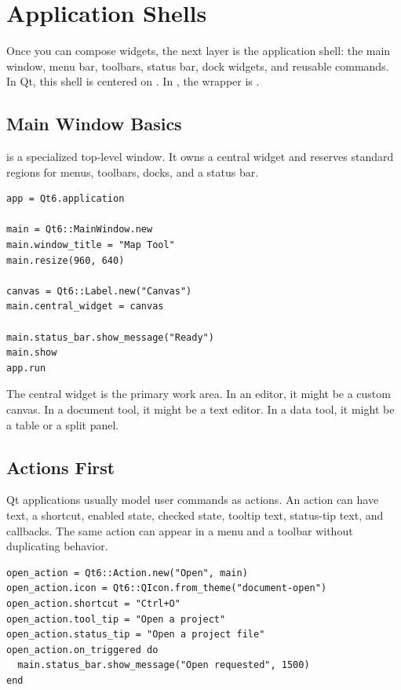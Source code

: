 \chapter{Application Shells}

Once you can compose widgets, the next layer is the application shell: the main window, menu bar, toolbars, status bar, dock widgets, and reusable commands. In Qt, this shell is centered on . In , the wrapper is .

\section{Main Window Basics}

 is a specialized top-level window. It owns a central widget and reserves standard regions for menus, toolbars, docks, and a status bar.

\begin{lstlisting}[style=crystal]
app = Qt6.application

main = Qt6::MainWindow.new
main.window_title = "Map Tool"
main.resize(960, 640)

canvas = Qt6::Label.new("Canvas")
main.central_widget = canvas

main.status_bar.show_message("Ready")
main.show
app.run
\end{lstlisting}

The central widget is the primary work area. In an editor, it might be a custom canvas. In a document tool, it might be a text editor. In a data tool, it might be a table or a split panel.

\section{Actions First}

Qt applications usually model user commands as actions. An action can have text, a shortcut, enabled state, checked state, tooltip text, status-tip text, and callbacks. The same action can appear in a menu and a toolbar without duplicating behavior.

\begin{lstlisting}[style=crystal]
open_action = Qt6::Action.new("Open", main)
open_action.icon = Qt6::QIcon.from_theme("document-open")
open_action.shortcut = "Ctrl+O"
open_action.tool_tip = "Open a project"
open_action.status_tip = "Open a project file"
open_action.on_triggered do
  main.status_bar.show_message("Open requested", 1500)
end
\end{lstlisting}

